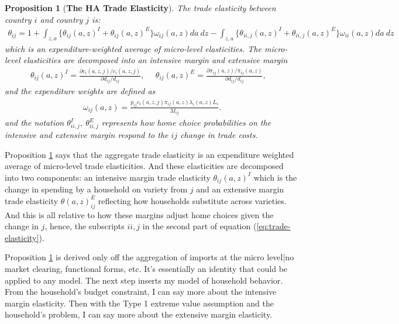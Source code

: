 \documentclass[12pt,pdftex]{article}
\newtheorem{prp}{Proposition}
\begin{document}
\begin{onehalfspacing}
\begin{prp}[\textbf{The HA Trade Elasticity}] \label{prp:GET} The trade elasticity between country $i$ and country $j$ is:
{\footnotesize
\begin{align}
\theta_{ij} = 1 + \int_{z,a} \bigg \{ \theta_{ij}(a,z)^{I} + \theta_{ij}(a,z)^{E} \bigg \}\omega_{ij}(a,z)da \ dz - \int_{z,a} \bigg \{ \theta_{ii,j}(a,z)^{I} + \theta_{ii,j}(a,z)^{E} \bigg \}\omega_{ii}(a,z)da \ dz
\label{eq:trade-elasticity}
\end{align}
}which is an expenditure-weighted average of micro-level elasticities. The micro-level elasticities are decomposed into an intensive margin and extensive margin
{\footnotesize
\begin{align}
\nonumber
\theta_{ij}(a,z)^{I} = \frac{\partial c_{i}(a,z,j)/ c_{i}(a,z,j)}{\partial d_{ij} / d_{ij}}, \ \ \ \ \ \ \theta_{ij}(a,z)^{E} = \frac{\partial \pi_{ij}(a,z) / \pi_{ij}(a,z)}{\partial d_{ij} / d_{ij}}, \ \ \ \
\end{align}
}
and the expenditure weights are defined as
{\footnotesize
\begin{align}
\nonumber
\omega_{ij}(a,z) = \frac{p_{ij}c_{i}(a,z,j)\pi_{ij}(a,z) \lambda_{i}(a,z) L_i}{M_{ij}}.
\end{align}
}
and the notation $\theta_{ii,j}^I,  \  \theta_{ii,j}^E $ represents how home choice probabilities on the intensive and extensive margin respond to the $ij$ change in trade costs.
\end{prp}

Proposition \ref{prp:GET} says that the aggregate trade elasticity is an expenditure weighted average of micro-level trade elasticities. And these elasticities are decomposed into two components: an intensive margin trade elasticity $\theta_{ij}(a,z)^{I}$ which is the change in spending by a household on variety from $j$ and an extensive margin trade elasticity $\theta(a,z)_{ij}^{E}$ reflecting how households substitute across varieties. And this is all relative to how these margins adjust home choices given the change in $j$, hence, the subscripts $ii,j$ in the second part of equation (\ref{eq:trade-elasticity}).

Proposition \ref{prp:GET} is derived only off the aggregation of imports at the micro level|no market clearing, functional forms, etc. It's essentially an identity that could be applied to any model. The next step inserts my model of household behavior. From the household's budget constraint, I can say more about the intensive margin elasticity. Then with the Type 1 extreme value assumption and the household's problem, I can say more about the extensive margin elasticity.


\end{onehalfspacing}
\end{document}
